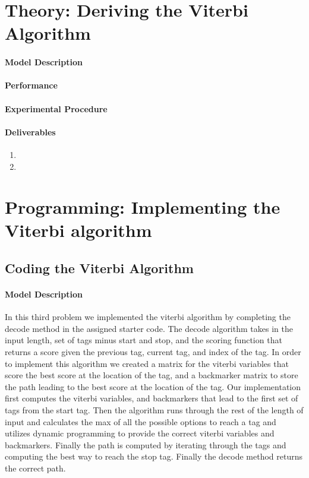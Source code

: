 \documentclass[11pt,letterpaper]{article}
\begin{document}
\section{Theory: Deriving the Viterbi Algorithm}

\paragraph{Model Description} 

\paragraph{Performance} 

\paragraph{Experimental Procedure}   

\paragraph{Deliverables}
\begin{enumerate}
    \item 
    \item
\end{enumerate}

\section{Programming: Implementing the Viterbi algorithm}

\subsection{Coding the Viterbi Algorithm}

\paragraph{Model Description} In this third problem we implemented the viterbi algorithm by completing the decode method in the assigned starter code. The decode algorithm takes in the input length, set of tags minus start and stop, and the scoring function that returns a score given the previous tag, current tag, and index of the tag. In order to implement this algorithm we created a matrix for the viterbi variables that score the best score at the location of the tag, and a backmarker matrix to store the path leading to the best score at the location of the tag. Our implementation first computes the viterbi variables, and backmarkers that lead to the first set of tags from the start tag. Then the algorithm runs through the rest of the length of input and calculates the max of all the possible options to reach a tag and utilizes dynamic programming to provide the correct viterbi variables and backmarkers. Finally the path is computed by iterating through the tags and computing the best way to reach the stop tag. Finally the decode method returns the correct path. 
\end{document}
